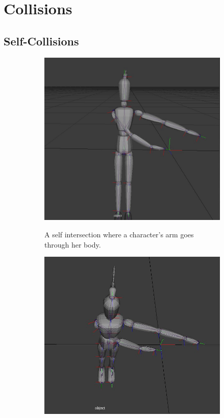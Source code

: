 \section{Collisions}
\subsection{Self-Collisions}
\begin{figure}[h!]
	\centering
        \begin{subfigure}[b!]{0.45\textwidth}
        	\centering
                \includegraphics[width=\linewidth]{img/selfintersection}
                \label{fig:self}
                \caption{A self intersection where a character's arm goes through her body.}
        \end{subfigure}
        \quad
        \begin{subfigure}[b!]{0.45\textwidth}
        	\centering
                \includegraphics[width=\linewidth]{img/selfintersection1}

\end{subfigure}
\end{figure}
